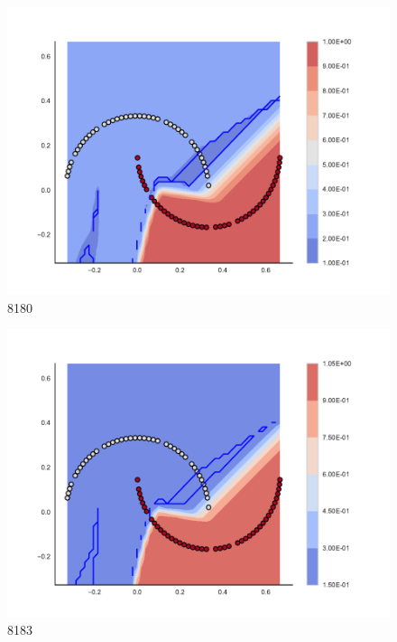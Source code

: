 \begin{subfigure}[b]{0.09\textwidth}
    \includegraphics[clip, trim=2.35cm 1.75cm 4.5cm 0cm,width=\textwidth]{img/convergence/8180.pdf}
    \caption{8180}
    \label{fig:convergence_8180}
\end{subfigure}
%
\begin{subfigure}[b]{0.09\textwidth}
    \includegraphics[clip, trim=2.35cm 1.75cm 4.5cm 0cm,width=\textwidth]{img/convergence/8183.pdf}
    \caption{8183}
    \label{fig:convergence_8183}
\end{subfigure}
%

